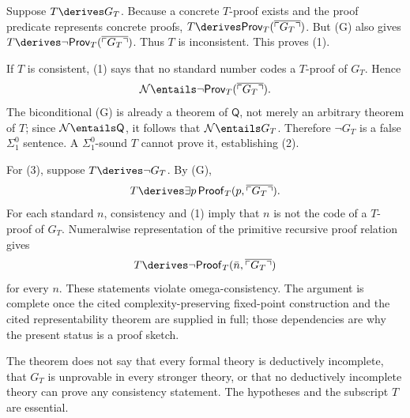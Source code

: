 \begin{proofplan}
Suppose \(T\derives G_T\).  Because a concrete \(T\)-proof exists and the
proof predicate represents concrete proofs,
\(T\derives\mathsf{Prov}_T(\overline{\ulcorner G_T\urcorner})\).  But (G)
also gives
\(T\derives\neg\mathsf{Prov}_T(\overline{\ulcorner G_T\urcorner})\).
Thus \(T\) is inconsistent.  This proves (1).

If \(T\) is consistent, (1) says that no standard number codes a
\(T\)-proof of \(G_T\).  Hence
\[
  \mathcal N\entails
  \neg\mathsf{Prov}_T(\overline{\ulcorner G_T\urcorner}).
\]
The biconditional (G) is already a theorem of \(\mathsf Q\), not merely an
arbitrary theorem of \(T\); since \(\mathcal N\entails\mathsf Q\), it follows
that \(\mathcal N\entails G_T\).
Therefore \(\neg G_T\) is a false \(\Sigma^0_1\) sentence.  A
\(\Sigma^0_1\)-sound \(T\) cannot prove it, establishing (2).

For (3), suppose \(T\derives\neg G_T\).  By (G),
\[
  T\derives\exists p\,
  \mathsf{Proof}_T(p,\overline{\ulcorner G_T\urcorner}).
\]
For each standard \(n\), consistency and (1) imply that \(n\) is not the code
of a \(T\)-proof of \(G_T\).  Numeralwise representation of the primitive
recursive proof relation gives
\[
  T\derives\neg
  \mathsf{Proof}_T(\bar n,\overline{\ulcorner G_T\urcorner})
\]
for every \(n\).  These statements violate omega-consistency.
The argument is complete once the cited complexity-preserving fixed-point
construction and the cited representability theorem are supplied in full;
those dependencies are why the present status is a proof sketch.
\end{proofplan}

\begin{warning}
The theorem does not say that every formal theory is deductively incomplete,
that \(G_T\) is unprovable in every stronger theory, or that no deductively
incomplete theory can prove any consistency statement.  The hypotheses and
the subscript \(T\) are essential.
\end{warning}

